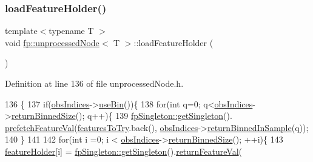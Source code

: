 \subsubsection{\texorpdfstring{load\+Feature\+Holder()}{loadFeatureHolder()}}
{\footnotesize\ttfamily template$<$typename T $>$ \\
void \hyperlink{classfp_1_1unprocessedNode}{fp\+::unprocessed\+Node}$<$ T $>$\+::load\+Feature\+Holder (\begin{DoxyParamCaption}{ }\end{DoxyParamCaption})\hspace{0.3cm}{\ttfamily [inline]}}



Definition at line 136 of file unprocessed\+Node.\+h.


\begin{DoxyCode}
136                                                \{
137                     \textcolor{keywordflow}{if}(\hyperlink{classfp_1_1unprocessedNode_aea171244695a3a099061188a9553e525}{obsIndices}->\hyperlink{classfp_1_1stratifiedInNodeClassIndices_af740a8054cefe977f8f1288fc6b39109}{useBin}())\{
138 \textcolor{keywordflow}{for}(\textcolor{keywordtype}{int} q=0; q<\hyperlink{classfp_1_1unprocessedNode_aea171244695a3a099061188a9553e525}{obsIndices}->\hyperlink{classfp_1_1stratifiedInNodeClassIndices_a9f77fe5e638170c4ad4ce99541561cfc}{returnBinnedSize}(); q++)\{
139                         \hyperlink{classfp_1_1fpSingleton_a8bdae77b68521003e3fc630edec2e240}{fpSingleton::getSingleton}().
      \hyperlink{classfp_1_1fpSingleton_ab789c4e4bfb3248711a5857015008f8d}{prefetchFeatureVal}(\hyperlink{classfp_1_1unprocessedNode_a3cffd07402568c03834d0a1248f3a6e3}{featuresToTry}.back(),
      \hyperlink{classfp_1_1unprocessedNode_aea171244695a3a099061188a9553e525}{obsIndices}->\hyperlink{classfp_1_1stratifiedInNodeClassIndices_a775d9a820b6f48ab44cd1ac4ffde1578}{returnBinnedInSample}(q));
140                         \}
141 
142                         \textcolor{keywordflow}{for}(\textcolor{keywordtype}{int} i =0; i < \hyperlink{classfp_1_1unprocessedNode_aea171244695a3a099061188a9553e525}{obsIndices}->\hyperlink{classfp_1_1stratifiedInNodeClassIndices_a9f77fe5e638170c4ad4ce99541561cfc}{returnBinnedSize}(); ++i)\{
143                             \hyperlink{classfp_1_1unprocessedNode_adbc4f28ec96b3ac3690cd28e71274bc5}{featureHolder}[i] = 
      \hyperlink{classfp_1_1fpSingleton_a8bdae77b68521003e3fc630edec2e240}{fpSingleton::getSingleton}().\hyperlink{classfp_1_1fpSingleton_aacc2eb894a219e2fe234743b51fa1a76}{returnFeatureVal}(

\end{DoxyCode}
